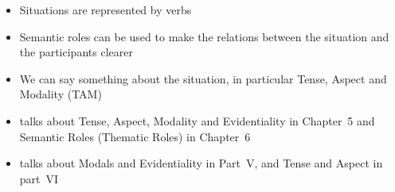 \documentclass[a4paper,landscape,headrule,footrule,xetex]{foils}
\begin{document}
\begin{itemize}
\item Situations are represented by verbs
\item Semantic roles can be used to make the relations between the situation and the participants clearer
\item We can say something about the situation, in particular Tense, Aspect and Modality (TAM)
\item \citet{Saeed:2015} talks about Tense, Aspect, Modality and Evidentiality in Chapter~5 and Semantic Roles (Thematic Roles) in  Chapter~6
\item  \citet{Kroeger:2022} talks about Modals and Evidentiality in Part~V, and Tense and Aspect in part~VI
\end{itemize}

\small



\end{document}
